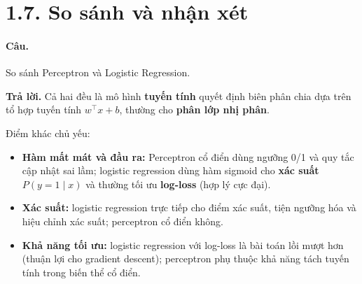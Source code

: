 \section*{1.7. So sánh và nhận xét}

\paragraph{Câu.} So sánh Perceptron và Logistic Regression.

\medskip\noindent\textbf{Trả lời.} Cả hai đều là mô hình \textbf{tuyến tính} quyết định biên phân chia dựa trên tổ hợp tuyến tính $w^\top x + b$, thường cho \textbf{phân lớp nhị phân}.

Điểm khác chủ yếu:
\begin{itemize}[nosep]
\item \textbf{Hàm mất mát và đầu ra:} Perceptron cổ điển dùng ngưỡng 0/1 và quy tắc cập nhật sai lầm; logistic regression dùng hàm sigmoid cho \textbf{xác suất} $P(y{=}1\mid x)$ và thường tối ưu \textbf{log-loss} (hợp lý cực đại).
\item \textbf{Xác suất:} logistic regression trực tiếp cho điểm xác suất, tiện ngưỡng hóa và hiệu chỉnh xác suất; perceptron cổ điển không.
\item \textbf{Khả năng tối ưu:} logistic regression với log-loss là bài toán lồi mượt hơn (thuận lợi cho gradient descent); perceptron phụ thuộc khả năng tách tuyến tính trong biến thể cổ điển.
\end{itemize}
